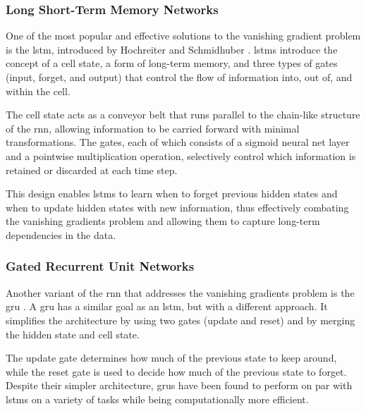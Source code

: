 \subsubsection{Long Short-Term Memory Networks}

One of the most popular and effective solutions to the vanishing gradient
problem is the \gls{lstm}, introduced by Hochreiter and Schmidhuber
\cite{lstm:1997}. \gls{lstm}s introduce the concept of a cell state, a form of
long-term memory, and three types of gates (input, forget, and output) that
control the flow of information into, out of, and within the cell.

The cell state acts as a conveyor belt that runs parallel to the chain-like
structure of the \gls{rnn}, allowing information to be carried forward with
minimal transformations. The gates, each of which consists of a sigmoid neural
net layer and a pointwise multiplication operation, selectively control which
information is retained or discarded at each time step.

This design enables \glspl{lstm} to learn when to forget previous hidden states
and when to update hidden states with new information, thus effectively
combating the vanishing gradients problem and allowing them to capture
long-term dependencies in the data.

\subsubsection{Gated Recurrent Unit Networks}

Another variant of the \gls{rnn} that addresses the vanishing gradients problem
is the \gls{gru} \cite{gru:2014}. A \gls{gru} has a similar goal as an
\gls{lstm}, but with a different approach. It simplifies the architecture by
using two gates (update and reset) and by merging the hidden state and cell
state.

The update gate determines how much of the previous state to keep around, while
the reset gate is used to decide how much of the previous state to forget.
Despite their simpler architecture, \glspl{gru} have been found to perform on
par with \glspl{lstm} on a variety of tasks while being computationally more
efficient.

